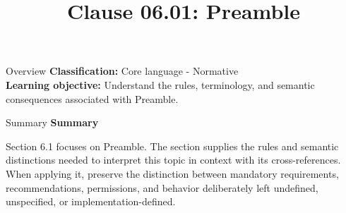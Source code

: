 \documentclass[10pt,letterpaper]{article}
\title{Clause 06.01: Preamble}
\author{}
\date{}
\begin{document}
\maketitle
\begin{CornellOverviewBox}{Overview}
\textbf{Classification:} Core language - Normative\\[2pt]
\textbf{Learning objective:} Understand the rules, terminology, and semantic consequences associated with Preamble.
\end{CornellOverviewBox}\begin{CornellSummaryBox}{Summary}
{\sffamily\bfseries\color{Accent} Summary}\par\vspace{3pt}Section 6.1 focuses on Preamble. The section supplies the rules and semantic distinctions needed to interpret this topic in context with its cross-references. When applying it, preserve the distinction between mandatory requirements, recommendations, permissions, and behavior deliberately left undefined, unspecified, or implementation-defined.
\end{CornellSummaryBox}
\end{document}

